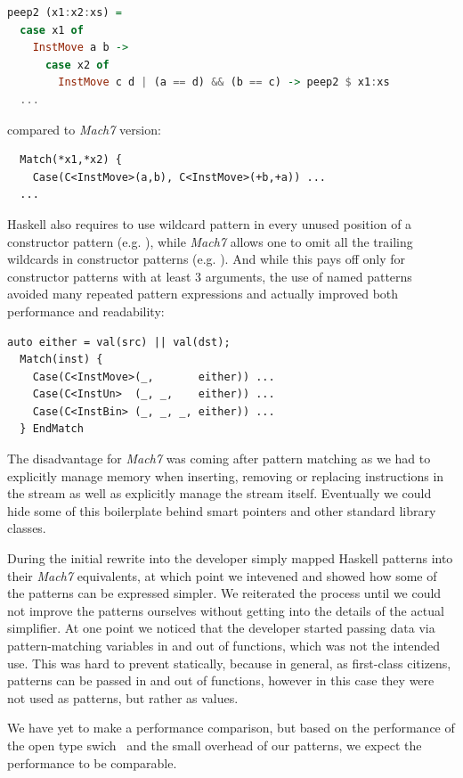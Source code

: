\begin{lstlisting}[language=Haskell]
peep2 (x1:x2:xs) = 
  case x1 of
    InstMove a b -> 
      case x2 of
        InstMove c d | (a == d) && (b == c) -> peep2 $ x1:xs
  ...
\end{lstlisting}

\noindent compared to \emph{Mach7} version:

\begin{lstlisting}
  Match(*x1,*x2) {
    Case(C<InstMove>(a,b), C<InstMove>(+b,+a)) ...
  ...
\end{lstlisting}

\noindent
Haskell also requires to use wildcard pattern in every unused position of a 
constructor pattern (e.g. ), while \emph{Mach7} 
allows one to omit all the trailing wildcards in constructor patterns (e.g. 
). And while this pays off only for constructor patterns with 
at least 3 arguments, the use of named patterns avoided many repeated pattern 
expressions and actually improved both performance and readability:

\begin{lstlisting}[columns=flexible]
  auto either = val(src) || val(dst);
  Match(inst) {
    Case(C<InstMove>(_,       either)) ...
    Case(C<InstUn>  (_, _,    either)) ...
    Case(C<InstBin> (_, _, _, either)) ...
  } EndMatch
\end{lstlisting}

\noindent
The disadvantage for \emph{Mach7} was coming after pattern matching as we had to 
explicitly manage memory when inserting, removing or replacing instructions in 
the stream as well as explicitly manage the stream itself. Eventually we could 
hide some of this boilerplate behind smart pointers and other standard library 
classes.

During the initial rewrite into \Cpp{} the developer simply mapped Haskell 
patterns into their \emph{Mach7} equivalents, at which point we intevened and 
showed how some of the patterns can be expressed simpler. We reiterated the 
process until we could not improve the patterns ourselves without getting into 
the details of the actual simplifier. At one point we noticed that the developer 
started passing data via pattern-matching variables  in and out of 
functions, which was not the intended use. This was hard to prevent statically, 
because in general, as first-class citizens, patterns can be passed in and out 
of functions, however in this case they were not used as patterns, but rather as 
values.

We have yet to make a performance comparison, but based on the performance of 
the open type swich~\cite{TS12} and the small overhead of our patterns, we 
expect the performance to be comparable.